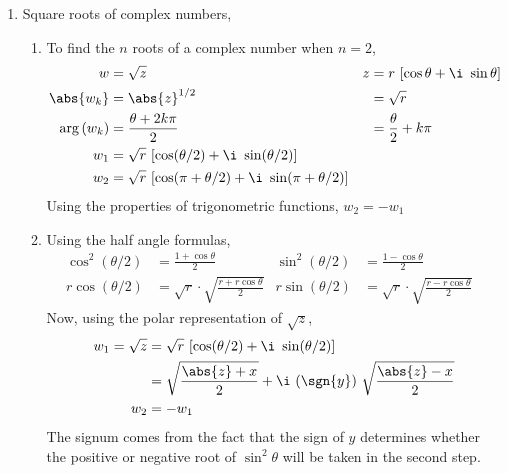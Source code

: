 \begin{enumerate}
    \item Square roots of complex numbers,
          \begin{enumerate}
              \item To find the $ n $ roots of a complex number when $ n=2 $,
                    \begin{align}
                        w           & = \sqrt{z}                         &
                        z           & = r\ [\cos\theta + \i\ \sin\theta]   \\
                        \abs{w_k}   & = \abs{z}^{1/2}                    &
                                    & = \sqrt{r}                           \\
                        \arg{(w_k)} & = \frac{\theta + 2k\pi}{2}         &
                                    & = \frac{\theta}{2} + k\pi            \\
                        w_1         & = \sqrt{r}\ [\cos(\theta/2)
                        + \i\ \sin(\theta/2)]                              \\
                        w_2         & = \sqrt{r}\ [\cos(\pi + \theta/2)
                        + \i\ \sin(\pi + \theta/2)]
                    \end{align}
                    Using the properties of trigonometric functions, $ w_2 = -w_1 $

              \item Using the half angle formulas,
                    \begin{align}
                        \cos^2(\theta/2)   & = \frac{1 + \cos\theta}{2} &
                        \sin^2(\theta/2)   & = \frac{1 - \cos\theta}{2}   \\
                        r\cos(\theta/2)    & = \sqrt{r} \cdot
                        \sqrt{\frac{r
                        + r\cos\theta}{2}} &
                        r\sin(\theta/2)    & = \sqrt{r} \cdot
                        \sqrt{\frac{r
                        - r\cos\theta}{2}} &
                    \end{align}
                    Now, using the polar representation of $ \sqrt{z} $,
                    \begin{align}
                        w_1 = \sqrt{z} & = \sqrt{r}\ [\cos(\theta/2)
                        + \i\ \sin(\theta/2)]                           \\
                                       & = \sqrt{\frac{\abs{z} + x}{2}}
                        + \i\ (\sgn{y}) \ \sqrt{\frac{\abs{z} - x}{2}}  \\
                        w_2            & = -w_1
                    \end{align}
                    The signum comes from the fact that the sign of $ y $ determines
                    whether the positive or negative root of $ \sin^2\theta $ will be
                    taken in the second step.


\end{enumerate}
\end{enumerate}
